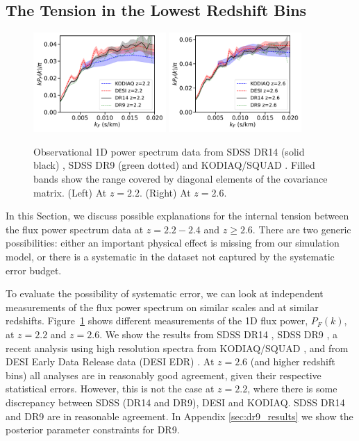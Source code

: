 \subsection{The Tension in the Lowest Redshift Bins}
\label{sec:tension}

\begin{figure}
    \centering
    \includegraphics[width=0.45\textwidth]{figures/lymandata-z2.2.pdf}
    \includegraphics[width=0.45\textwidth]{figures/lymandata-z2.6.pdf}
    \caption{\label{fig:p1d_data}
    Observational 1D power spectrum data from SDSS DR14 (solid black) \protect\cite{2019JCAP...07..017C}, SDSS DR9 (green dotted) \protect\cite{2013A&A...559A..85P} and KODIAQ/SQUAD \protect\cite{2022MNRAS.509.2842K}.
    Filled bands show the range covered by diagonal elements of the covariance matrix.
    (Left) At $z=2.2$.
    (Right) At $z=2.6$.}
\end{figure}

In this Section, we discuss possible explanations for the internal tension between the flux power spectrum data at $z=2.2 - 2.4$ and $z \geq 2.6$.
There are two generic possibilities: either an important physical effect is missing from our simulation model, or there is a systematic in the dataset not captured by the systematic error budget. 

To evaluate the possibility of systematic error, we can look at independent measurements of the flux power spectrum on similar scales and at similar redshifts.
Figure~\ref{fig:p1d_data} shows different measurements of the 1D flux power, $P_F(k)$, at $z=2.2$ and $z=2.6$.
We show the results from SDSS DR14 \cite{2019JCAP...07..017C}, SDSS DR9 \cite{2013A&A...559A..85P}, a recent analysis using high resolution spectra from KODIAQ/SQUAD \cite{2022MNRAS.509.2842K}, and from DESI Early Data Release data (DESI EDR) \cite{2023arXiv230606316G}.
At $z=2.6$ (and higher redshift bins) all analyses are in reasonably good agreement, given their respective statistical errors.
However, this is not the case at $z=2.2$, where there is some discrepancy between SDSS (DR14 and DR9), DESI and KODIAQ.
SDSS DR14 and DR9 are in reasonable agreement.
In Appendix \ref{sec:dr9_results} we show the posterior parameter constraints for DR9.

